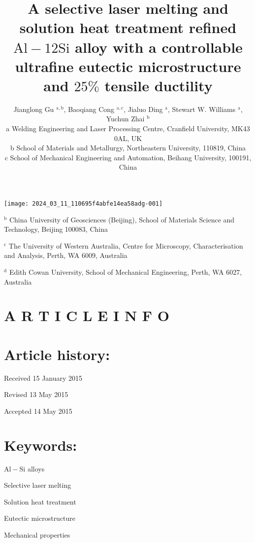 \documentclass[10pt]{article}
\title{A selective laser melting and solution heat treatment refined $\mathrm{Al}-12 \mathrm{Si}$ alloy with a controllable ultrafine eutectic microstructure and $25 \%$ tensile ductility }
\author{Jianglong Gu ${ }^{\mathrm{a}, \mathrm{b}}$, Baoqiang Cong ${ }^{\mathrm{a}, \mathrm{c}}$, Jialuo Ding ${ }^{\mathrm{a}}$, Stewart W. Williams ${ }^{\mathrm{a}}$, Yuchun Zhai ${ }^{\mathrm{b}}$\\
a Welding Engineering and Laser Processing Centre, Cranfield University, MK43 0AL, UK\\
b School of Materials and Metallurgy, Northeastern University, 110819, China\\
c School of Mechanical Engineering and Automation, Beihang University, 100191, China}
\date{}
\begin{document}
\maketitle
\begin{center}
\texttt{[image: 2024\_03\_11\_110695f4abfe14ea58adg-001]}
\end{center}

${ }^{\mathrm{b}}$ China University of Geosciences (Beijing), School of Materials Science and Technology, Beijing 100083, China

${ }^{\mathrm{c}}$ The University of Western Australia, Centre for Microscopy, Characterisation and Analysis, Perth, WA 6009, Australia

${ }^{\mathrm{d}}$ Edith Cowan University, School of Mechanical Engineering, Perth, WA 6027, Australia

\section*{A R T I C L E I N F O}
\section*{Article history:}
Received 15 January 2015

Revised 13 May 2015

Accepted 14 May 2015

\section*{Keywords:}
$\mathrm{Al}-\mathrm{Si}$ alloys

Selective laser melting

Solution heat treatment

Eutectic microstructure

Mechanical properties
\end{document}
